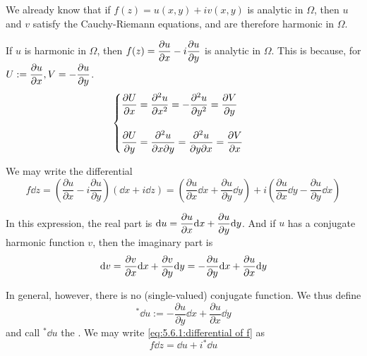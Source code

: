 We already know that if  $ f(z)=u(x,y)+iv(x,y) $ is analytic in  $ \Omega  $, then  $ u $ and  $ v  $ satisfy the Cauchy-Riemann equations, and are therefore harmonic in  $ \Omega $.

If  $ u  $ is harmonic in  $ \Omega  $, then  $ f(z)=\displaystyle\frac{\partial u}{\partial x}-i\frac{\partial u}{\partial y} $ is analytic in  $ \Omega $. This is because, for  $ U:=\displaystyle\frac{\partial u}{\partial x}, V=-\frac{\partial u}{\partial y}$.
\begin{equation}\label{eq:5.6.1:harmonic function induces an anlytic function}
    \begin{cases}
        \displaystyle\frac{\partial U }{\partial x}=\frac{\partial ^2 u}{\partial x^2}=-\frac{\partial ^2 u}{\partial y^2}=\frac{\partial V}{\partial y}\\
        \\
        
        \displaystyle\frac{\partial U}{\partial y}=\frac{\partial ^2 u}{\partial x\partial y}=\frac{\partial ^2 u}{\partial y\partial x}=\frac{\partial V}{\partial x}
    \end{cases}
\end{equation}

We may write the differential 
\begin{equation}
    f \dd z=\left(\frac{\partial u}{\partial x}-i\frac{\partial u}{\partial y}\right)\left(\dd x+i\dd z\right)=\left(\frac{\partial u}{\partial x}\dd x+\frac{\partial u}{\partial y}\dd y \right)+i\left(\frac{\partial u }{\partial x}\dd y-\frac{\partial u }{\partial y }\dd x\right)\label{eq:5.6.1:differential of f}
\end{equation}

In this expression, the real part is  $ \displaystyle\mathrm{d} u=\frac{\partial u }{\partial x}\mathrm{d} x+\frac{\partial u }{\partial y}\mathrm{d} y $.
And if  $ u  $ has a conjugate harmonic function  $ v $, then the imaginary part is  \[\displaystyle \mathrm{d} v=\frac{\partial v }{\partial x}\mathrm{d} x+\frac{\partial v}{\partial y}\mathrm{d} y=-\frac{\partial u}{\partial y}\mathrm{d} x+\frac{\partial u}{\partial x}\mathrm{d} y  \]

In general, however, there is no (single-valued) conjugate function. We thus define 
\begin{equation}
    {}^*\dd u:=-\frac{\partial u}{\partial y}\dd x+\frac{\partial u}{\partial x}\dd y\label{eq:5.6.1:definition of conjugate differential of du}
\end{equation}
and call  $ {}^*\dd u  $ the . We may write \eqref{eq:5.6.1:differential of f} as 
\begin{equation}
    f\dd z=\dd u+i{}^*\dd u\label{eq:5.6.1:simplication of differential of f}
\end{equation}

